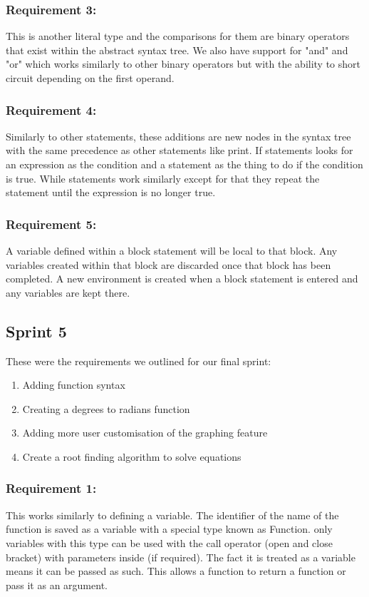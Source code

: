 \documentclass[a4paper, oneside, 11pt]{report}
\begin{document}
\subsubsection{Requirement 3: }
This is another literal type and the comparisons for them are binary operators that exist within the abstract syntax tree. We also have support for "and" and "or" which works similarly to other binary operators but with the ability to short circuit depending on the first operand.
\subsubsection{Requirement 4: }
Similarly to other statements, these additions are new nodes in the syntax tree with the same precedence as other statements like print. If statements looks for an expression as the condition and a statement as the thing to do if the condition is true. While statements work similarly except for that they repeat the statement until the expression is no longer true.
\subsubsection{Requirement 5: }
A variable defined within a block statement will be local to that block. Any variables created within that block are discarded once that block has been completed. A new environment is created when a block statement is entered and any variables are kept there.

\subsection{Sprint 5}
These were the requirements we outlined for our final sprint:
\begin{enumerate}
\item Adding function syntax
\item Creating a degrees to radians function
\item Adding more user customisation of the graphing feature
\item Create a root finding algorithm to solve equations
\end{enumerate}

\subsubsection{Requirement 1: }
This works similarly to defining a variable. The identifier of the name of the function is saved as a variable with a special type known as Function. only variables with this type can be used with the call operator (open and close bracket) with parameters inside (if required). The fact it is treated as a variable means it can be passed as such. This allows a function to return a function or pass it as an argument.
\end{document}
